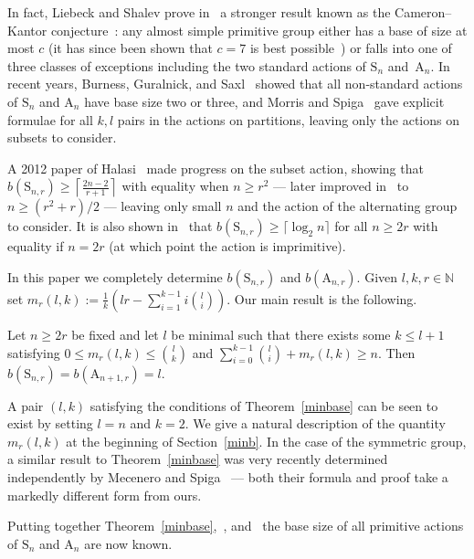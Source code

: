 \documentclass[ALCO,published]{cedram}
\renewcommand\S{\mathrm{S}}
\begin{document}
In fact, Liebeck and Shalev prove in~\cite{lie3} a stronger result known as the Cameron--Kantor conjecture~\cite{ck}: any almost simple primitive group either has a base of size at most $c$ (it has since been shown that  $c=7$ is best possible~\cite[Corollary 1]{burn1}) or falls into one of three classes of exceptions including the two standard actions of $\S_n$ and~$\mathrm{A}_n$. In recent years, Burness, Guralnick, and Saxl~\cite[Corollaries 4 and 5]{burn2} showed that all non-standard actions of $\S_n$ and $\mathrm{A}_n$ have base size two or three, and Morris and Spiga~\cite[Theorems 1.1 and 1.2]{ms} gave explicit formulae for all $k,l$ pairs in the actions on partitions, leaving only the actions on subsets to consider. 

A 2012 paper of Halasi~\cite{hal} made progress on the subset action, showing that $b(\S_{n,r})\geq\left\lceil\frac{2n-2}{r+1}\right\rceil$ with equality when $n\geq r^2$ --- later improved in~\cite{cac} to $n\geq (r^2+r)/2$ --- leaving only small $n$ and the action of the alternating group to consider. It is also shown in~\cite{hal} that $b(\S_{n,r})\geq \lceil \log_2 n\rceil$ for all $n\geq 2r$ with equality if $n=2r$ (at which point the action is imprimitive).

In this paper we completely determine $b(\S_{n,r})$ and $b(\mathrm{A}_{n,r})$. Given $l,k,r\in\mathbb{N}$ set $m_r(l,k):=\frac{1}{k}\left(lr-\sum_{i=1}^{k-1}i\binom{l}{i}\right)$. Our main result is the following.

\begin{thm}\label{minbase}
Let $n\geq 2r$ be fixed and let $l$ be minimal such that there exists some $k\leq l+1$ satisfying $0\leq m_r(l,k)\leq\binom{l}{k}$ and $\sum_{i=0}^{k-1}\binom{l}{i}+m_r(l,k)\geq n.$ Then $b(\S_{n,r})=b(\mathrm{A}_{n+1,r})=l$.
\end{thm}

\begin{remas}
A pair $(l,k)$ satisfying the conditions of Theorem~\ref{minbase} can be seen to exist by setting $l=n$ and $k=2$. We give a natural description of the quantity $m_r(l,k)$ at the beginning of Section~\ref{minb}. In the case of the symmetric group, a similar result to Theorem~\ref{minbase} was very recently determined independently by Mecenero and Spiga~\cite{MeSp} --- both their formula and proof take a markedly different form from ours.
\end{remas}

Putting together Theorem~\ref{minbase},~\cite[Corollaries 4 and 5, and Remark 7]{burn2}, and~\cite[Theorems 1.1 and 1.2]{ms} the base size of all primitive actions of $\S_n$ and $\mathrm{A}_n$ are now known.
\end{document}
